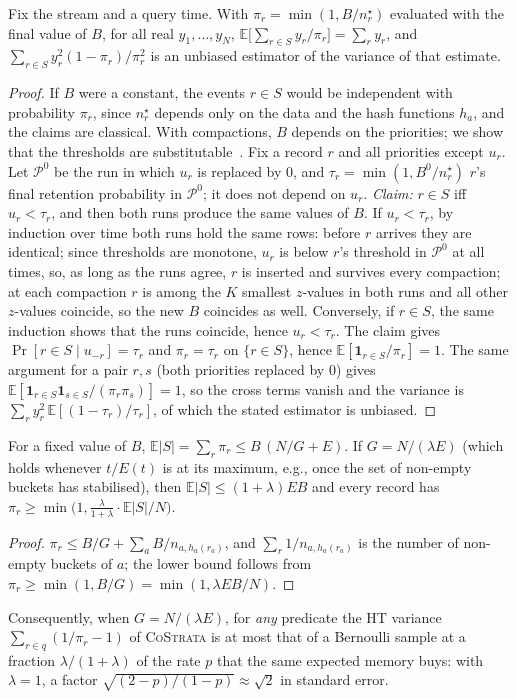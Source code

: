 \documentclass[sigconf]{acmart}
\newcommand{\cs}{\textsc{CoStrata}\xspace}
\newcommand{\E}{\mathbb{E}}
\newcommand{\nstar}{n^{\star}}
\begin{document}
\begin{theorem}\label{thm:unbiased}
Fix the stream and a query time. With $\pi_r=\min(1,B/\nstar_r)$ evaluated with the final value of $B$,
for all real $y_1,\dots,y_N$,
$\E\bigl[\sum_{r\in S}y_r/\pi_r\bigr]=\sum_r y_r$, and
$\sum_{r\in S}y_r^2(1-\pi_r)/\pi_r^2$ is an unbiased estimator of the variance of that estimate.
\end{theorem}
\begin{proof}
If $B$ were a constant, the events $r\in S$ would be independent with probability $\pi_r$, since $\nstar_r$
depends only on the data and the hash functions $h_a$, and the claims are classical. With compactions,
$B$ depends on the priorities; we show that the thresholds are substitutable~\cite{ting-ats}. Fix a record
$r$ and all priorities except $u_r$. Let $\mathcal P^0$ be the run in which $u_r$ is replaced by $0$, and
$\tau_r=\min(1,B^0/\nstar_r)$ $r$'s final retention probability in $\mathcal P^0$; it does not depend on
$u_r$. \emph{Claim:} $r\in S$ iff $u_r<\tau_r$, and then both runs produce the same values of $B$. If
$u_r<\tau_r$, by induction over time both runs hold the same rows: before $r$ arrives they are identical;
since thresholds are monotone, $u_r$ is below $r$'s threshold in $\mathcal P^0$ at all times, so, as long as
the runs agree, $r$ is inserted and survives every compaction; at each compaction $r$ is among the $K$
smallest $z$-values in both runs and all other $z$-values coincide, so the new $B$ coincides as well.
Conversely, if $r\in S$, the same induction shows that the runs coincide, hence $u_r<\tau_r$. The claim
gives $\Pr[r\in S\mid u_{-r}]=\tau_r$ and $\pi_r=\tau_r$ on $\{r\in S\}$, hence
$\E[\mathbf 1_{r\in S}/\pi_r]=1$. The same argument for a pair $r,s$ (both priorities replaced by $0$)
gives $\E[\mathbf 1_{r\in S}\mathbf 1_{s\in S}/(\pi_r\pi_s)]=1$, so the cross terms vanish and the
variance is $\sum_r y_r^2\,\E[(1-\tau_r)/\tau_r]$, of which the stated estimator is unbiased.
\end{proof}

\begin{proposition}\label{prop:size}
For a fixed value of $B$, $\E|S|=\sum_r\pi_r\le B\,(N/G+E)$. If $G=N/(\lambda E)$ (which holds whenever
$t/E(t)$ is at its maximum, e.g., once the set of non-empty buckets has stabilised), then
$\E|S|\le(1+\lambda)EB$ and every record has $\pi_r\ge\min\bigl(1,\tfrac{\lambda}{1+\lambda}\cdot\E|S|/N\bigr)$.
\end{proposition}
\begin{proof}
$\pi_r\le B/G+\sum_a B/n_{a,h_a(r_a)}$, and $\sum_r 1/n_{a,h_a(r_a)}$ is the number of non-empty
buckets of $a$; the lower bound follows from $\pi_r\ge\min(1,B/G)=\min(1,\lambda EB/N)$.
\end{proof}
Consequently, when $G=N/(\lambda E)$, for \emph{any} predicate the HT variance $\sum_{r\in q}(1/\pi_r-1)$ of
\cs is at most that of a Bernoulli sample at a fraction $\lambda/(1+\lambda)$ of the rate $p$ that the same
expected memory buys: with $\lambda=1$, a factor $\sqrt{(2-p)/(1-p)}\approx\sqrt2$ in standard error.
\end{document}
